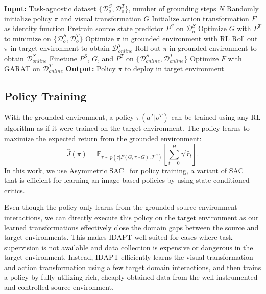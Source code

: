 \begin{algorithm}[t]
    \caption{\fullmethod}
    \label{alg:method}
    \begin{algorithmic}[1]
        \STATE \textbf{Input:} Task-agnostic dataset $\{\mathcal{D}_o^S,\mathcal{D}_o^T\}$, number of grounding steps $N$
        \STATE Randomly initialize policy $\pi$ and visual transformation $G$
        \STATE Initialize action transformation $F$ as identity function
        \STATE Pretrain source state predictor $P^S$ on $\mathcal{D}^S_o$
        \STATE Optimize $G$ with $P^T$ to minimize  on $\{ \mathcal{D}^S_o, \mathcal{D}^T_o \}$
            \STATE Optimize $\pi$ in grounded environment with RL 
            \STATE Roll out $\pi$ in target environment to obtain $ \mathcal{D}^T_{online}$
            \STATE Roll out $\pi$ in grounded environment to obtain $ \mathcal{D}^S_{online}$
            \STATE Finetune $P^S$, $G$, and $P^T$ on $\{\mathcal{D}^S_{online},\mathcal{D}^T_{online}\}$
            \STATE Optimize $F$ with GARAT on $\mathcal{D}^T_{online}$
        \ENDFOR
        \STATE \textbf{Output:} Policy $\pi$ to deploy in target environment
    \end{algorithmic}
\end{algorithm}  


\subsection{Policy Training}
\label{sec:policy_training}

With the grounded environment, a policy $\pi(a^T | o^T)$ can be trained using any RL algorithm as if it were trained on the target environment. The policy learns to maximize the expected return  from the grounded environment:
\begin{equation}
    \label{eqn:grounded_J}
    \hat{J}(\pi) = \mathbb{E}_{\tau \sim p(\tau| F(G, \pi \circ G),\mathcal{T}^S )} \left [\sum_{t=0}^H \gamma^t \hat{r}_t \right ].
\end{equation}
In this work, we use Asymmetric SAC~\citep{pinto2017asymmetric} for policy training, a variant of SAC~\citep{haarnoja2018sac} that is efficient for learning an image-based policies by using state-conditioned critics.  

Even though the policy only learns from the grounded source environment interactions, we can directly execute this policy on the target environment as our learned transformations effectively close the domain gaps between the source and target environments. This makes IDAPT well suited for cases where task supervision is not available and data collection is expensive or dangerous in the target environment. Instead, IDAPT efficiently learns the visual transformation and action transformation using a few target domain interactions, and then trains a policy by fully utilizing rich, cheaply obtained data from the well instrumented and controlled source environment.

